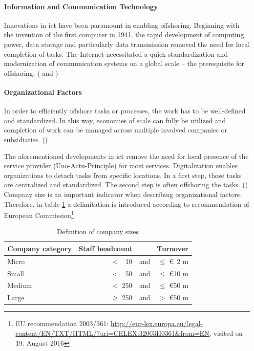 \paragraph{Information and Communication Technology}
Innovations in \gls{ict} have been paramount in enabling offshoring. Beginning with the invention of the first computer in 1941, the rapid development of computing power, data storage and particularly data transmission removed the need for local completion of tasks. The Internet necessitated a quick standardization and modernization of communication systems on a global scale -- the prerequisite for offshoring. (\cite[pp. 9f]{Hutzschenreuter.2007} and \cite[p. 93]{Jahns.2007})

\paragraph{Organizational Factors}
In order to efficiently offshore tasks or processes, the work has to be well-defined and standardized. In this way, economies of scale can fully be utilized and completion of work can be managed across multiple involved companies or subsidiaries. (\cite[p. 11]{Hutzschenreuter.2007})

The aforementioned developments in \gls{ict} remove the need for local presence of the service provider (Uno-Actu-Principle) for most services. Digitalization enables organizations to detach tasks from specific locations. In a first step, those tasks are centralized and standardized. The second step is often offshoring the tasks. (\cite[pp. 12f]{Hutzschenreuter.2007})
\newpage
Company size is an important indicator when describing organizational factors. Therefore, in table \ref{tab:CompanySize} a delimitation is introduced according to recommendation of European Commission\footnote{EU recommendation 2003/361: \url{http://eur-lex.europa.eu/legal-content/EN/TXT/HTML/?uri=CELEX:32003H0361&from=EN}, visited on 19. August 2016}.
\vspace{3mm}
\begin{table}[htb!]
	\centering
	\begin{tabular}{l | r c r}
		\textbf{Company category} & \textbf{Staff headcount} && \textbf{Turnover}\\ \hline
		\rule{0pt}{3ex}   Micro & $<$ \, 10 &  and & $\le$ \euro \, 2 m\\ \hline
		\rule{0pt}{3ex}   Small & $<$ \, 50 & and & $\le$ \euro 10 m\\ \hline
		\rule{0pt}{3ex}   Medium & $<$ 250 & and & $\le$ \euro 50 m\\ \hline
		\rule{0pt}{3ex}   Large & $\ge$ 250 & and & $>$ \euro 50 m\\
	\end{tabular}
	\vspace{3mm}
	\caption{Definition of company sizes}
	\label{tab:CompanySize}
\end{table}

